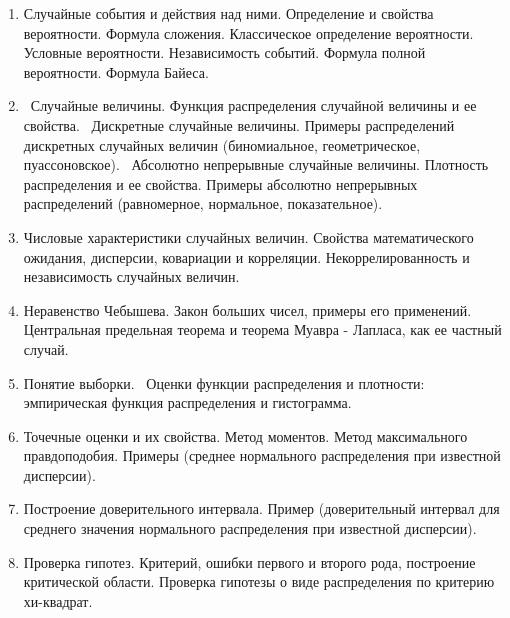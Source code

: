 %
%

\begin{enumerate}

\item Случайные события и действия над ними. Определение и свойства вероятности. Формула  сложения. Классическое определение вероятности. Условные вероятности. Независимость событий. Формула полной вероятности. Формула Байеса.


\item Случайные величины. Функция распределения случайной величины и ее свойства.  Дискретные случайные величины. Примеры распределений дискретных случайных величин (биномиальное, геометрическое,  пуассоновское).  Абсолютно непрерывные случайные  величины. Плотность распределения и ее свойства. Примеры абсолютно непрерывных распределений (равномерное, нормальное, показательное). 

\item Числовые характеристики случайных величин. Свойства математического ожидания, дисперсии, ковариации и корреляции. Некоррелированность и независимость случайных величин.
\item Неравенство Чебышева. Закон больших чисел, примеры его применений.
Центральная предельная теорема и теорема Муавра - Лапласа, как ее частный случай.

\item Понятие выборки.   Оценки функции распределения и плотности: эмпирическая функция распределения и гистограмма.

\item Точечные оценки и их свойства. Метод моментов. Метод максимального правдоподобия. Примеры (среднее нормального распределения при известной дисперсии).

\item Построение доверительного интервала. Пример (доверительный интервал для среднего значения нормального распределения при известной дисперсии).

\item Проверка гипотез. Критерий, ошибки первого и второго рода, построение критической области. Проверка гипотезы о виде распределения по критерию хи-квадрат.

\end{enumerate}




